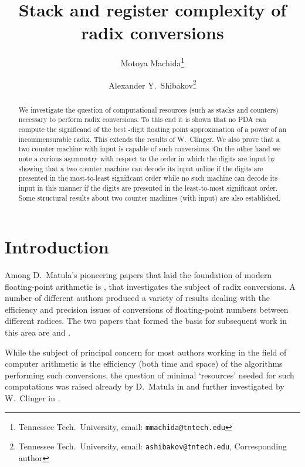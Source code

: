 \documentclass[12pt]{article}
\title{Stack and register complexity of radix conversions}
\author{Motoya Machida\footnote{Tennessee Tech.\ University, email: {\tt mmachida@tntech.edu}}\and 
Alexander Y.~Shibakov\footnote{Tennessee Tech.\ University, email: {\tt ashibakov@tntech.edu}, Corresponding author}}
\begin{document}
\maketitle
\begin{abstract}
We investigate the question of computational resources (such as stacks
and counters) necessary to perform radix conversions. To this end it
is shown that no PDA can compute the significand of the best
-digit floating point approximation of a power of an
incommensurable radix. This extends the results of W.~Clinger. We also
prove that a two counter machine with input is capable of such conversions. On
the other hand we note a curious asymmetry with respect to the order in
which the digits are input by showing that a two counter machine can
decode its input online if the digits are presented in the
most-to-least significant order while no such machine can decode its input in this
manner if the digits are presented in the least-to-most significant
order. Some structural results about two counter machines (with input) are also
established.
\end{abstract}
\newtheorem{lemma}{Lemma}
\newtheorem{corollary}{Corollary}
\newtheorem{proposition}{Proposition}
\newtheorem{theorem}{Theorem}
\newtheorem{definition}{Definition}
\newtheorem{question}{Question}

\def\ttd{{\tt d}}
\def\ttD{{\tt D}}
\def\ttC{{\tt C}}
\def\ttb{{\tt b}}
\def\dg#1{\mathop{\to}\limits^{#1}}
\def\df#1{\mathop{\Rightarrow}\limits^{#1}}
\def\ndf#1{\mathop{\Rightarrow}\limits^{#1}\varnothing}
\def\nndf#1{\mathop{\not\Rightarrow}\limits^{#1}}
\def\dgn#1{\mathop{\to}\limits^{d_{#1}}}
\def\gstop{\diamond}

\section{Introduction}
Among D.~Matula's pioneering papers that laid the foundation of
modern floating-point arithmetic is \cite{Matulainout}, that investigates the
subject of radix conversions. A number of different authors produced a
variety of results dealing with the efficiency and precision issues of
conversions of floating-point numbers between different radices. The
two papers that formed the basis for subsequent work in this area are
\cite{Steele} and \cite{Clinger}. 

While the subject of principal concern for most authors working in
the field of computer arithmetic is the efficiency (both time and
space) of the algorithms performing such conversions, the question of
minimal `resources' needed for such computations was raised already by
D.~Matula in \cite{Matulainout} and further investigated by W.~Clinger
in \cite{Clinger}.
\end{document}
